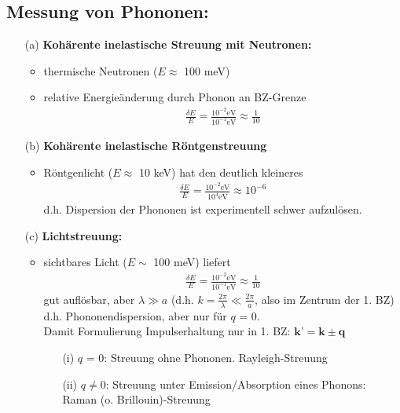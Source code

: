 \subsection*{Messung von Phononen:}
\begin{itemize}
	\item[(a)] \textbf{Kohärente inelastische Streuung mit Neutronen:}
	\begin{itemize}
		\item thermische Neutronen ($E \approx$ 100 meV)
		\item relative Energieänderung durch Phonon an BZ-Grenze
		\begin{align*}
			\frac{\delta E}{E} = \frac{10^{-2} \text{eV}}{10^{-1} \text{eV}} \approx \frac{1}{10}
		\end{align*}
	\end{itemize}
	\item[(b)] \textbf{Kohärente inelastische Röntgenstreuung}
	\begin{itemize}
		\item Röntgenlicht ($E \approx$ 10 keV) hat den deutlich kleineres
		\begin{align*}
			\frac{\delta E}{E} = \frac{10^{-2} \text{eV}}{10^{4} \text{eV}} \approx 10^{-6}
		\end{align*}
		d.h. Dispersion der Phononen ist experimentell schwer aufzulösen.
	\end{itemize}
	\item[(c)] \textbf{Lichtstreuung:}
	\begin{itemize}
		\item sichtbares Licht ($E \sim$ 100 meV) liefert
		\begin{align*}
			\frac{\delta E}{E} = \frac{10^{-2} \text{eV}}{10^{-1} \text{eV}} \approx \frac{1}{10}
		\end{align*}
		gut auflösbar, aber $\lambda \gg a$ (d.h. $k = \frac{2 \pi}{\lambda} \ll \frac{2 \pi}{a}$, also im Zentrum der 1. BZ)\\
		d.h. Phononendispersion, aber nur für $q$ = 0.\\
		Damit Formulierung Impulserhaltung nur in 1. BZ: $\textbf{k'} = \textbf{k} \pm \textbf{q}$
		\begin{itemize}
			\item[(i)] $q$ = 0: Streuung ohne Phononen. Rayleigh-Streuung
			\item[(ii)] $q \neq 0$: Streuung unter Emission/Absorption eines Phonons: Raman (o. Brillouin)-Streuung
		\end{itemize}
	\end{itemize}  
\end{itemize}



